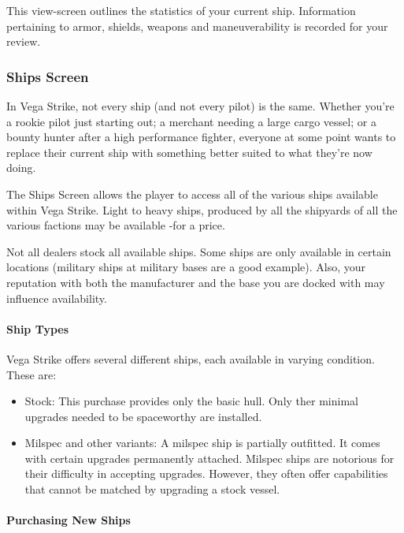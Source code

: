 \documentclass{article}
\begin{document}
This view-screen outlines the statistics of your current ship. Information pertaining to armor, shields, weapons and maneuverability is recorded for your review. 

\subsubsection{ Ships Screen }

In Vega Strike, not every ship (and not every pilot) is the same. Whether you're a rookie pilot just starting out; a merchant needing a large cargo vessel; or a bounty hunter after a high performance fighter, everyone at some point wants to replace their current ship with something better suited to what they're now doing. 

The Ships Screen allows the player to access all of the various ships available within Vega Strike. Light to heavy ships, produced by all the shipyards of all the various factions may be available -for a price. 

Not all dealers stock all available ships. Some ships are only available in certain locations (military ships at military bases are a good example). Also, your reputation with both the manufacturer and the base you are docked with may influence availability. 

\paragraph{Ship Types }

Vega Strike offers several different ships, each available in varying condition. These are: 

\begin{itemize}
\item  Stock: This purchase provides only the basic hull. Only ther minimal  upgrades needed to be spaceworthy are installed.
\end{itemize}



\begin{itemize}
\item  Milspec and other variants: A milspec ship is partially outfitted. It comes with certain upgrades permanently attached. Milspec ships are notorious for their difficulty in accepting upgrades. However, they often offer capabilities that cannot be matched by upgrading a stock vessel. 
\end{itemize}



\paragraph{Purchasing New Ships }
\end{document}
